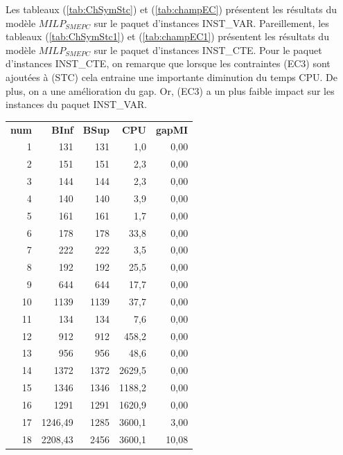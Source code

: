 {Les tableaux (\ref{tab:ChSymStc}) et (\ref{tab:champEC}) présentent les résultats du modèle \textit{$MILP_{SMEPC}$} sur le paquet d'instances INST\_VAR.
Pareillement, les tableaux (\ref{tab:ChSymStc1}) et (\ref{tab:champEC1}) présentent les résultats du modèle \textit{$MILP_{SMEPC}$} sur le paquet d'instances INST\_CTE.
Pour le paquet d'instances INST\_CTE, on remarque que lorsque les contraintes (EC3) sont ajoutées à (STC) cela entraine une importante diminution du temps CPU. De plus, on a une amélioration du gap. Or, (EC3) a un plus faible impact sur les instances du paquet INST\_VAR.
\begin{table}[H]
	\centering
	\small
	\begin{tabular}{|r|r|r|r|r|}
		\hline
		\toprule
		\rowcolor{cyan}	\multicolumn{4}{c}{ STC}                       &  \\ \hline
		\midrule
		\rowcolor{cyan}	\textbf{num} &  \textbf{BInf} & \textbf{BSup}   & \textbf{CPU} & \textbf{gapMI} \\ \hline
		\midrule
		1	&	131	&	131	&	1,0	&	0,00	\\ \hline
		2	&	151	&	151	&	2,3	&	0,00	\\ \hline
		3	&	144	&	144	&	2,3	&	0,00	\\ \hline
		4	&	140	&	140	&	3,9	&	0,00	\\ \hline
		5	&	161	&	161	&	1,7	&	0,00	\\ \hline
		6	&	178	&	178	&	33,8	&	0,00	\\ \hline
		7	&	222	&	222	&	3,5	&	0,00	\\ \hline
		8	&	192	&	192	&	25,5	&	0,00	\\ \hline
		9	&	644	&	644	&	17,7	&	0,00	\\ \hline
		10	&	1139	&	1139	&	37,7	&	0,00	\\ \hline
		11	&	134	&	134	&	7,6	&	0,00	\\ \hline
		12	&	912	&	912	&	458,2	&	0,00	\\ \hline
		13	&	956	&	956	&	48,6	&	0,00	\\ \hline
		14	&	1372	&	1372	&	2629,5	&	0,00	\\ \hline
		15	&	1346	&	1346	&	1188,2	&	0,00	\\ \hline
		16	&	1291	&	1291	&	1620,9	&	0,00	\\ \hline
		17	&	1246,49	&	1285	&	3600,1	&	3,00	\\ \hline
		18	&	2208,43	&	2456	&	3600,1	&	10,08	\\ \hline

\end{tabular}
\end{table}}
